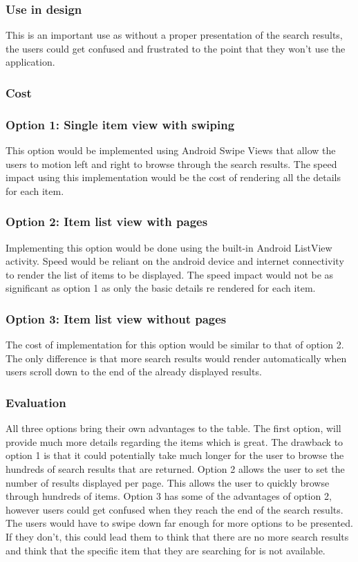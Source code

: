 \documentclass[journal,compsoc, 10pt, draftclsnofoot, onecolumn]{IEEEtran}
\begin{document}
\subsubsection{Use in design}
This is an important use as without a proper presentation of the search results, 
the users could get confused and frustrated to the point that they won't use the 
application.
\subsubsection{Cost}
\subsubsection*{Option 1: Single item view with swiping}
This option would be implemented using Android Swipe Views that allow the users 
to motion left and right to browse through the search results. The speed impact 
using this implementation would be the cost of rendering all the details for each 
item. 
\subsubsection*{Option 2: Item list view with pages}
Implementing this option would be done using the built-in Android ListView 
activity. Speed would be reliant on the android device and internet connectivity 
to render the list of items to be displayed. The speed impact would not be as 
significant as option 1 as only the basic details re rendered for each item.
\subsubsection*{Option 3: Item list view without pages}
The cost of implementation for this option would be similar to that of option 2. 
The only difference is that more search results would render automatically when 
users scroll down to the end of the already displayed results. 

\subsubsection{Evaluation}
All three options bring their own advantages to the table. The first option, will 
provide much more details regarding the items which is great. The drawback to 
option 1 is that it could potentially take much longer for the user to browse the 
hundreds of search results that are returned. Option 2 allows the user to set the 
number of results displayed per page. This allows the user to quickly browse through 
hundreds of items. Option 3 has some of the advantages of option 2, however users 
could get confused when they reach the end of the search results. The users would 
have to swipe down far enough for more options to be presented. If they don't, this 
could lead them to think that there are no more search results and think that the 
specific item that they are searching for is not available. 
\end{document}

